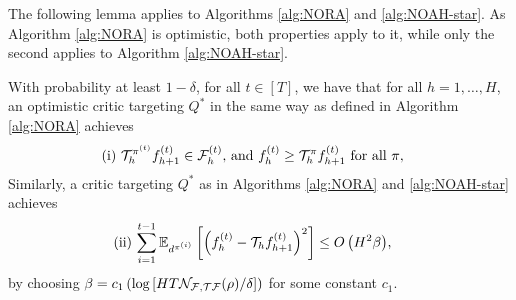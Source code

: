 The following lemma applies to Algorithms \ref{alg:NORA} and \ref{alg:NOAH-star}. As Algorithm \ref{alg:NORA} is optimistic, both properties apply to it, while only the second applies to Algorithm \ref{alg:NOAH-star}.

\begin{lem}
With probability at least $1-\delta$, for all $t \in\left[T\right]$, we have that for all $h=1, \ldots, H$, an optimistic critic targeting $Q^*$ in the same way as defined in Algorithm \ref{alg:NORA} achieves
\begin{align*}
&\text{(i) ${\mathcal{T}}_h^{\pi^{(t)}} f_{h+1}^{{(t)}} \in \mathcal{F}_h^{(t)}$, and $f_h^{(t)} \geq {\mathcal{T}}_h^{\pi}f_{h+1}^{(t)}$ for all $\pi$,}
\end{align*}
Similarly, a critic targeting $Q^*$ as in Algorithms \ref{alg:NORA} and \ref{alg:NOAH-star} achieves
\begin{align*}
&\text{(ii) $\sum_{i=1}^{t-1} \mathbb{E}_{d^{\pi^{(i)}}}\left[\left(f_h^{(t)} - {\mathcal{T}}_h f_{h+1}^{(t)}\right)^2\right] \leq O\left(H^2 \beta\right)$,}
\end{align*}
by choosing $\beta=c_1\left(\log \left[H T\mathcal{N}_{{\mathcal{F}},{\mathcal{T}} {\mathcal{F}}}(\rho) / \delta\right]\right)$ for some constant $c_1$.
\label{lem:ac-loss-bounded-optimism}
\end{lem}

